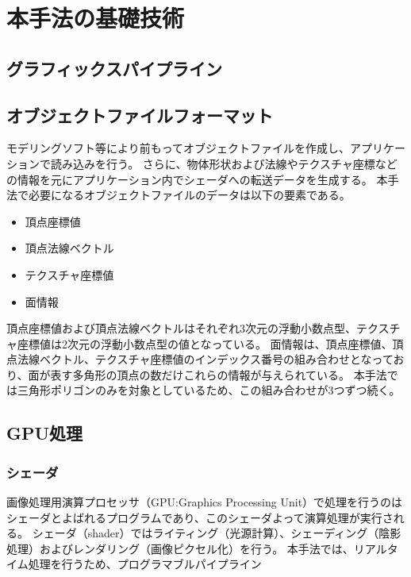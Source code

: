 \chapter{本手法の基礎技術}
\label{CBasicmethod}

\section{グラフィックスパイプライン}
\label{SGraphicspipeline}

\section{オブジェクトファイルフォーマット}
\label{SObjfileformat}

モデリングソフト等により前もってオブジェクトファイルを作成し、アプリケーションで読み込みを行う。
さらに、物体形状および法線やテクスチャ座標などの情報を元にアプリケーション内でシェーダへの転送データを生成する。
本手法で必要になるオブジェクトファイルのデータは以下の要素である。

\begin{itemize}
\item 頂点座標値
\item 頂点法線ベクトル
\item テクスチャ座標値
\item 面情報
\end{itemize}

頂点座標値および頂点法線ベクトルはそれぞれ3次元の浮動小数点型、テクスチャ座標値は2次元の浮動小数点型の値となっている。
面情報は、頂点座標値、頂点法線ベクトル、テクスチャ座標値のインデックス番号の組み合わせとなっており、面が表す多角形の頂点の数だけこれらの情報が与えられている。
本手法では三角形ポリゴンのみを対象としているため、この組み合わせが3つずつ続く。

\section{GPU処理}
\label{SGpumethod}

\subsection{シェーダ}
\label{SSShader}
画像処理用演算プロセッサ（GPU:Graphics Processing Unit）で処理を行うのはシェーダとよばれるプログラムであり、このシェーダよって演算処理が実行される。
シェーダ（shader）ではライティング（光源計算）、シェーディング（陰影処理）およびレンダリング（画像ピクセル化）を行う。
本手法では、リアルタイム処理を行うため、プログラマブルパイプライン
